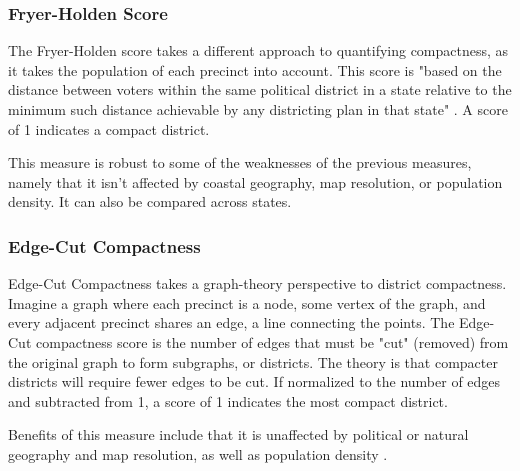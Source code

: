 \subsubsection{Fryer-Holden Score}

The Fryer-Holden score takes a different approach to quantifying compactness, as it takes the population of each precinct into account. This score is "based on the distance between voters within the same political district in a state relative to the minimum such distance achievable by any districting plan in that state" \parencite[2]{fryer2007}. A score of 1 indicates a compact district. 

This measure is robust to some of the weaknesses of the previous measures, namely that it isn't affected by coastal geography, map resolution, or population density. It can also be compared across states. \parencite{fryer2007}

\subsubsection{Edge-Cut Compactness}

Edge-Cut Compactness takes a graph-theory perspective to district compactness. Imagine a graph where each precinct is a node, some vertex of the graph, and every adjacent precinct shares an edge, a line connecting the points. The Edge-Cut compactness score is the number of edges that must be "cut" (removed) from the original graph to form subgraphs, or districts. The theory is that compacter districts will require fewer edges to be cut. \parencite{dube2016} If normalized to the number of edges and subtracted from 1, a score of 1 indicates the most compact district. 

Benefits of this measure include that it is unaffected by political or natural geography and map resolution, as well as population density \parencite[11]{mccartan2020}. 